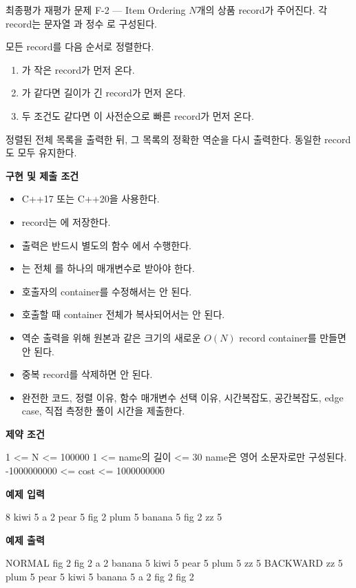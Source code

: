 \begin{problembox}{최종평가 재평가 문제 F-2 --- Item Ordering}
$N$개의 상품 record가 주어진다. 각 record는 문자열 과 정수 로 구성된다.

모든 record를 다음 순서로 정렬한다.
\begin{enumerate}
  \item {}가 작은 record가 먼저 온다.
  \item {}가 같다면  길이가 긴 record가 먼저 온다.
  \item 두 조건도 같다면 이 사전순으로 빠른 record가 먼저 온다.
\end{enumerate}

정렬된 전체 목록을 출력한 뒤, 그 목록의 정확한 역순을 다시 출력한다. 동일한  record도 모두 유지한다.

\textbf{구현 및 제출 조건}
\begin{itemize}
  \item C++17 또는 C++20을 사용한다.
  \item record는 에 저장한다.
  \item 출력은 반드시 별도의 함수 에서 수행한다.
  \item {}는 전체 를 하나의 매개변수로 받아야 한다.
  \item 호출자의 container를 수정해서는 안 된다.
  \item 호출할 때 container 전체가 복사되어서는 안 된다.
  \item 역순 출력을 위해 원본과 같은 크기의 새로운 $O(N)$ record container를 만들면 안 된다.
  \item 중복 record를 삭제하면 안 된다.
  \item 완전한 코드, 정렬 이유, 함수 매개변수 선택 이유, 시간복잡도, 공간복잡도, edge case, 직접 측정한 풀이 시간을 제출한다.
\end{itemize}

\textbf{제약 조건}
\begin{TextBlock}
1 <= N <= 100000
1 <= name의 길이 <= 30
name은 영어 소문자로만 구성된다.
-1000000000 <= cost <= 1000000000
\end{TextBlock}

\textbf{예제 입력}
\begin{TextBlock}
8
kiwi 5
a 2
pear 5
fig 2
plum 5
banana 5
fig 2
zz 5
\end{TextBlock}

\textbf{예제 출력}
\begin{TextBlock}
NORMAL
fig 2
fig 2
a 2
banana 5
kiwi 5
pear 5
plum 5
zz 5
BACKWARD
zz 5
plum 5
pear 5
kiwi 5
banana 5
a 2
fig 2
fig 2
\end{TextBlock}
\end{problembox}

